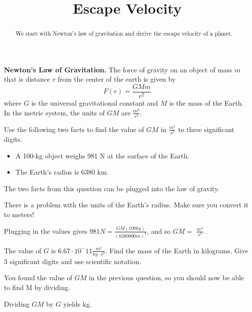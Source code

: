 \documentclass{ximera}
\title{Escape Velocity}
\begin{document}
\begin{abstract}
We start with Newton's law of gravitation and derive the escape velocity of a planet.
\end{abstract}
\maketitle

\begin{observation}
\textbf{Newton's Law of Gravitation.} The force of gravity on an object of mass $m$ that is distance $r$ from the center of the earth is given by
$$ F(r) = \frac{G M m}{r^2}$$
where $G$ is the universal gravitational constant and $M$ is the mass of the Earth. In the metric system, the units of $G M$ are $\frac{m^3}{s^2}$.
\end{observation}

\begin{question}
Use the following two facts to find the value of $GM$ in $\frac{m^3}{s^2}$ to three significant digits. 
\begin{itemize}
\item A 100-kg object weighs 981 N at the surface of the Earth.
\item The Earth's radius is 6380 km.
\end{itemize}
\begin{solution}
\begin{hint}
The two facts from this question can be plugged into the law of gravity.
\end{hint}
\begin{hint}
There is a problem with the units of the Earth's radius. Make sure you convert it to meters!
\end{hint}
Plugging in the values gives $981 N = \frac{GM (100 kg)}{(6380000 m)^2}$, and so $GM =$  $\frac{m^3}{s^2}$.
\end{solution}
\end{question}

\begin{question}
The value of $G$ is $6.67 \cdot 10^-{11} \frac{m^3}{kg \cdot s^2}$. Find the mass of the Earth in kilograms. Give 3 significant digits and use scientific notation.
\begin{solution}
\begin{hint}
You found the value of $G M$ in the previous question, so you should now be able to find M by dividing.
\end{hint}
Dividing $G M$ by $G$ yields  kg.
\end{solution}
\end{question}
\end{document}
